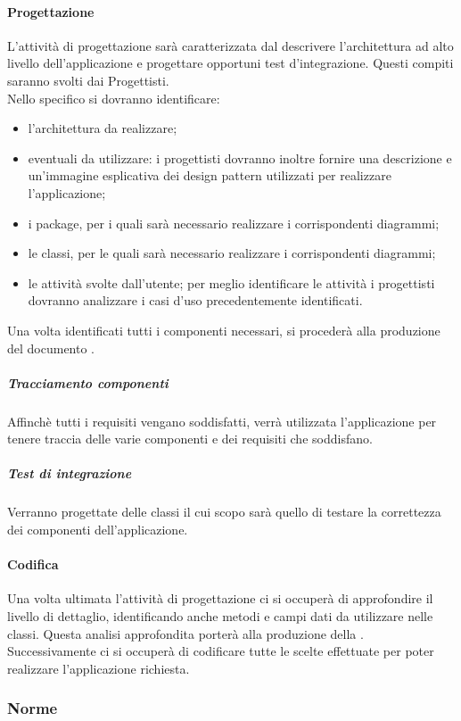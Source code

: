 		\paragraph{Progettazione}
		\label{sec:2.1.1.2}
			L'attività di progettazione sarà caratterizzata dal descrivere l'architettura ad alto livello dell'applicazione e progettare opportuni test d'integrazione. Questi compiti saranno svolti dai Progettisti. \\
			Nello specifico si dovranno identificare:
			\begin{itemize}
				\item l'architettura da realizzare;
				\item eventuali  da utilizzare: i progettisti dovranno inoltre fornire una descrizione e un'immagine esplicativa dei design pattern utilizzati per realizzare l'applicazione;
				\item i package, per i quali sarà necessario realizzare i corrispondenti diagrammi;
				\item le classi, per le quali sarà necessario realizzare i corrispondenti diagrammi;
				\item le attività svolte dall'utente; per meglio identificare le attività i progettisti dovranno analizzare i casi d'uso precedentemente identificati.
			\end{itemize}
			Una volta identificati tutti i componenti necessari, si procederà alla produzione del documento \STdoc.
			\subparagraph{Tracciamento componenti}
			\label{sec:2.1.1.2.3}
				Affinchè tutti i requisiti vengano soddisfatti, verrà utilizzata l'applicazione  per tenere traccia delle varie componenti e dei requisiti che soddisfano.
			\subparagraph{Test di integrazione}
			\label{sec:2.1.1.2.4}
				Verranno progettate delle classi il cui scopo sarà quello di testare la correttezza dei componenti dell'applicazione.
		\paragraph{Codifica}
		Una volta ultimata l'attività di progettazione ci si occuperà di approfondire il livello di dettaglio, identificando anche metodi e campi dati da utilizzare nelle classi. Questa analisi approfondita porterà alla produzione della \DPdoc. \\
		Successivamente ci si occuperà di codificare tutte le scelte effettuate per poter realizzare l'applicazione richiesta.
\subsubsection{Norme}
\label{sec:2.1.2}
